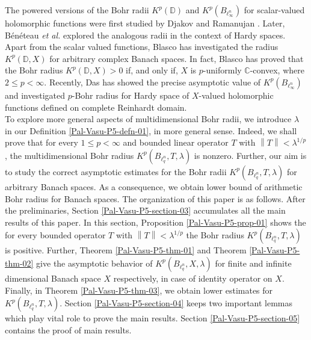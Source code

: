 \documentclass[a4paper,12pt]{amsart}
\theoremstyle{definition}
\newcommand{\norm}[1]{\left\lVert#1\right\rVert}
\begin{document}
 The powered versions of the Bohr radii $K^p(\mathbb{D})$ and $K^p(B_{\ell^n_{\infty}})$ for scalar-valued holomorphic functions were first studied by Djakov and Ramanujan \cite{Djakov & Ramanujan & J. Anal & 2000}. Later, B\'{e}n\'{e}teau {\it et al.} \cite{bene-2004} explored the analogous radii in the context of Hardy spaces. Apart from the scalar valued functions, Blasco \cite{Blasco-Collect-2017} has investigated the radius $K^p(\mathbb{D},X)$ for arbitrary complex Banach spaces. In fact, Blasco \cite[Theorem 1.10]{Blasco-Collect-2017} has proved that the Bohr radius $K^p(\mathbb{D},X)>0$ if, and only if, $X$ is $p$-uniformly $\mathbb{C}$-convex, where $2\leq p<\infty$. Recently, Das \cite{das-2023,Das-2024-forum} has showed the precise asymptotic value of $K^p(B_{\ell^n_{\infty}})$ and investigated $p$-Bohr radius for Hardy space of $X$-valued holomorphic functions defined on complete Reinhardt domain.\\[1mm]
 
   To explore more general aspects of multidimensional Bohr radii, we introduce $\lambda$ in our Definition \ref{Pal-Vasu-P5-defn-01}, in more general sense. Indeed, we shall prove that for every $1\leq p<\infty$ and bounded linear operator $T$ with $\norm{T}<\lambda^{1/p}$, the multidimensional Bohr radius $K^p(B_{\ell^n_q},T,\lambda)$ is nonzero. Further, our aim is to study the correct asymptotic estimates for the Bohr radii $K^p(B_{\ell^n_q},T,\lambda)$ for arbitrary Banach spaces. As a consequence, we obtain lower bound of arithmetic Bohr radius for Banach spaces. The organization of this paper is as follows. After the preliminaries, Section \ref{Pal-Vasu-P5-section-03} accumulates all the main results of this paper. In this section, Proposition \ref{Pal-Vasu-P5-prop-01} shows the for every bounded operator $T$ with $\norm{T}<\lambda^{1/p}$ the Bohr radius $K^p(B_{\ell^n_q},T,\lambda)$ is positive. Further, Theorem \ref{Pal-Vasu-P5-thm-01} and Theorem \ref{Pal-Vasu-P5-thm-02} give the asymptotic behavior of $K^p(B_{\ell^n_q},X,\lambda)$ for finite and infinite dimensional Banach space $X$ respectively, in case of identity operator on $X$. Finally, in Theorem \ref{Pal-Vasu-P5-thm-03}, we obtain lower estimates for $K^p(B_{\ell^n_q},T,\lambda)$. Section \ref{Pal-Vasu-P5-section-04} keeps two important lemmas which play vital role to prove the main results. Section \ref{Pal-Vasu-P5-section-05} contains the proof of main results.
 
\end{document}

